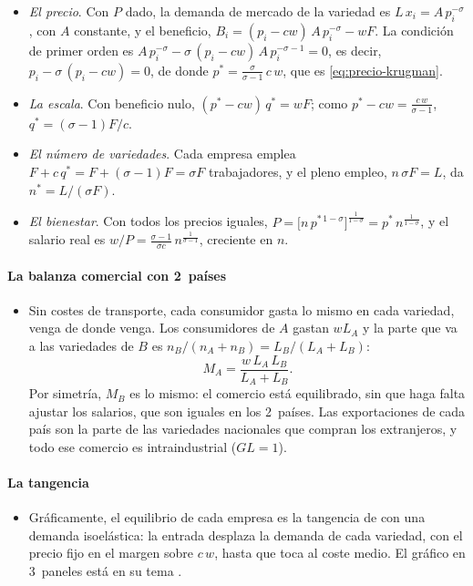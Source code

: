 \documentclass[11pt]{article}
\begin{document}
\begin{itemize}
\item \emph{El precio}. Con $P$ dado, la demanda de mercado de la variedad es $L\,x_i=A\,p_i^{-\sigma}$, con $A$ constante, y el beneficio, $B_i=(p_i-cw)\,A\,p_i^{-\sigma}-wF$. La condición de primer orden es $A\,p_i^{-\sigma}-\sigma\,(p_i-cw)\,A\,p_i^{-\sigma-1}=0$, es decir, $p_i-\sigma\,(p_i-cw)=0$, de donde $p^*=\frac{\sigma}{\sigma-1}\,c\,w$, que es \eqref{eq:precio-krugman}.
\item \emph{La escala}. Con beneficio nulo, $(p^*-cw)\,q^*=wF$; como $p^*-cw=\frac{c\,w}{\sigma-1}$, $q^*=(\sigma-1)F/c$.
\item \emph{El número de variedades}. Cada empresa emplea $F+c\,q^*=F+(\sigma-1)F=\sigma F$ trabajadores, y el pleno empleo, $n\,\sigma F=L$, da $n^*=L/(\sigma F)$.
\item \emph{El bienestar}. Con todos los precios iguales, $P=\big[n\,p^{*\,1-\sigma}\big]^{\frac{1}{1-\sigma}}=p^*\,n^{\frac{1}{1-\sigma}}$, y el salario real es $w/P=\frac{\sigma-1}{\sigma c}\,n^{\frac{1}{\sigma-1}}$, creciente en $n$.\findemo
\end{itemize}

\paragraph{La balanza comercial con 2~países}

\begin{itemize}
\item Sin costes de transporte, cada consumidor gasta lo mismo en cada variedad, venga de donde venga. Los consumidores de $A$ gastan $wL_A$ y la parte que va a las variedades de $B$ es $n_B/(n_A+n_B)=L_B/(L_A+L_B)$:
  $$M_A=\frac{w\,L_A\,L_B}{L_A+L_B}.$$
  Por simetría, $M_B$ es lo mismo: el comercio está equilibrado, sin que haga falta ajustar los salarios, que son iguales en los 2~países. Las exportaciones de cada país son la parte de las variedades nacionales que compran los extranjeros, y todo ese comercio es intraindustrial ($GL=1$).
\end{itemize}

\paragraph{La tangencia}

\begin{itemize}
\item Gráficamente, el equilibrio de cada empresa es la tangencia de  con una demanda isoelástica: la entrada desplaza la demanda de cada variedad, con el precio fijo en el margen sobre $c\,w$, hasta que toca al coste medio. El gráfico en 3~paneles está en su tema .
\end{itemize}
\end{document}

